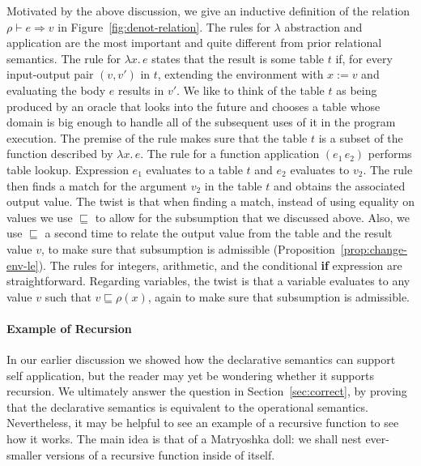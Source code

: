 \documentclass{tufte-handout}
\newcommand{\LAM}[1]{\lambda #1.\,}
\newcommand{\APP}[0]{\,}
\newcommand{\by}[0]{\!:=\!}
\begin{document}
Motivated by the above discussion, we give an inductive definition of
the relation $\rho \vdash e \Rightarrow v$ in
Figure~\ref{fig:denot-relation}. The rules for $\lambda$ abstraction
and application are the most important and quite different from prior
relational semantics.
%
The rule for $\LAM{x} e$ states that the result is some table $t$ if,
for every input-output pair $(v,v')$ in $t$, extending the environment
with $x\by v$ and evaluating the body $e$ results in $v'$.  We like to
think of the table $t$ as being produced by an oracle that looks into
the future and chooses a table whose domain is big enough to handle
all of the subsequent uses of it in the program execution. The premise
of the rule makes sure that the table $t$ is a subset of the function
described by $\LAM{x} e$.
%
The rule for a function application $(e_1 \APP e_2)$ performs table
lookup. Expression $e_1$ evaluates to a table $t$ and $e_2$ evaluates
to $v_2$. The rule then finds a match for the argument $v_2$ in the
table $t$ and obtains the associated output value. The twist is that
when finding a match, instead of using equality on values we use
$\sqsubseteq$ to allow for the subsumption that we discussed above.
Also, we use $\sqsubseteq$ a second time to relate the output value
from the table and the result value $v$, to make sure that
subsumption is admissible (Proposition~\ref{prop:change-env-le}).
%
The rules for integers, arithmetic, and the conditional \textbf{if}
expression are straightforward. Regarding variables, the twist is that
a variable evaluates to any value $v$ such that $v \sqsubseteq
\rho(x)$, again to make sure that subsumption is admissible.



\paragraph{Example of Recursion}

In our earlier discussion we showed how the declarative semantics can
support self application, but the reader may yet be wondering whether
it supports recursion. We ultimately answer the question in
Section~\ref{sec:correct}, by proving that the declarative semantics
is equivalent to the operational semantics. Nevertheless, it may be
helpful to see an example of a recursive function to see how it works.
The main idea is that of a Matryoshka doll: we shall nest ever-smaller
versions of a recursive function inside of itself.
\end{document}
